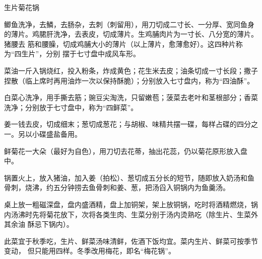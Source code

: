 \begin{recipe}{生片菊花锅}

\ingredients


\preparation

\step 鲫鱼洗净，去鱗，去肠杂，去刺（刺留用），用刀切成二寸长、一分厚、宽同鱼身
的薄片。鸡𬂁肝洗净，去表皮，切成薄片。生鸡脯肉片为一寸长、八分宽的薄片。猪腰去
筋和腰臊，切成鸡脯大小的薄片（以上薄片，愈薄愈好）。这四种片称为“四生片”，分别
摆于七寸盘中成风车形。

\step 菜油一斤入锅烧红，投入粉条，炸成黄色；花生米去皮；油条切成一寸长段；撒子
捏散（临上席时再用油炸一次以保持酥脆）；分别放入七寸盘内，称为“四油酥”。

\step 白菜心洗净，用手撕去筋；豌豆尖淘洗，只留嫩苞；菠菜去老叶和茎根部分；香菜
洗净；分别放于七寸盘中，称为“四鲜菜”。

\step 姜一钱去皮，切成细末；葱切成葱花；与胡椒、味精共摆一碟，每样占碟的四分之
一。另以小碟盛盐备用。

\step 鲜菊花一大朵（最好为自色），用刀切去花蒂，抽出花蕊，仍以菊花原形放入盘
中。

\step 锅置火上，放入猪油，加入姜（拍松）、葱切成五分长的短节，随即放入奶汤和鱼
骨刺，烧沸，约五分钟捞去鱼骨刺和姜、葱，把汤舀入铜锅内为鱼羹汤。

\step 桌上放一粗磁深盘，盘内盛酒精，盘上加铜架，架上放铜锅，吃时将酒精燃烧，锅
内汤沸时先将菊花放下，次将各类生肉、生菜分别于汤内烫熟吃（除生片、生菜外其余油
酥忌下锅内）。

\features

此菜宜于秋季吃，生片、鲜菜汤味清鲜，佐酒下饭均宜。菜内生片、鲜菜可按季节变动，
但只能用四样。冬季改用梅花，即名“梅花锅”。

\end{recipe}

